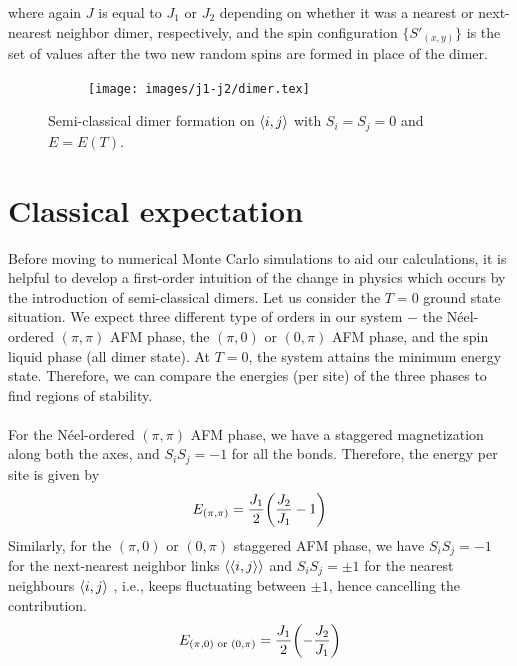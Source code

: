 \documentclass[../journal_main.tex]{subfiles}
\begin{document}
where again $J$ is equal to $J_1$ or $J_2$ depending on whether it was a nearest or next-nearest neighbor dimer, respectively, and the spin configuration $\{S'_{(x,y)}\}$ is the set of values after the two new random spins are formed in place of the dimer.
\begin{figure}[t!]
    \centering
    \begin{subfigure}[b]{0.8\textwidth}  %
        \centering
        \texttt{[image: images/j1-j2/dimer.tex]}
    \end{subfigure}
    \caption{Semi-classical dimer formation on $\expval{i, j}$  with $S_i = S_j = 0$ and $E = E(T)$.}
    \label{}
\end{figure}
\FloatBarrier \!\!\!\!\!\!\!\!\!\!\!
\section{Classical expectation}
Before moving to numerical Monte Carlo simulations to aid our calculations, it is helpful to develop a first-order intuition of the change in physics which occurs by the introduction of semi-classical dimers.
Let us consider the $T = 0$ ground state situation. We expect three different type of orders in our system $-$ the Néel-ordered $(\pi, \pi)$ AFM phase, the $(\pi, 0)$ or $(0, \pi)$ AFM phase, and the spin liquid phase (all dimer state). At $T = 0$, the system attains the minimum energy state. Therefore, we can compare the energies (per site) of the three phases to find regions of stability.~\\~\\
For the Néel-ordered $(\pi, \pi)$ AFM phase, we have a staggered magnetization along both the axes, and $S_i S_j = - 1$ for all the bonds. Therefore, the energy per site is given by
\begin{equation}
    E_{(\pi, \pi)} = \frac{J_1}{2} \qty(\frac{J_2}{J_1} - 1)
\end{equation}
Similarly, for the $(\pi, 0)$ or $(0, \pi)$ staggered AFM phase, we have $S_i S_j = -1$ for the next-nearest neighbor links $\expval{\expval{i, j}}$ and $S_i S_j = \pm 1$ for the nearest neighbours $\expval{i, j}$ , i.e., keeps fluctuating between $\pm 1$, hence cancelling the contribution.
\begin{equation}
    E_{(\pi, 0) \text{ or } (0, \pi)} = \frac{J_1}{2}\qty(-\frac{J_2}{J_1})
\end{equation} 
\end{document}
